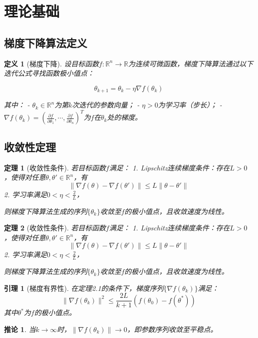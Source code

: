 \documentclass[12pt,a4paper,oneside]{article} %
\newtheorem{theorem}{定理}[section]
\newtheorem{definition}{定义}[section]
\newtheorem{lemma}{引理}[section]
\newtheorem{corollary}{推论}[section]
\begin{document}
\section{理论基础}
\subsection{梯度下降算法定义}
\begin{definition}[梯度下降]
设目标函数$f:\mathbb{R}^n \to \mathbb{R}$为连续可微函数，梯度下降算法通过以下迭代公式寻找函数极小值点：

    $$\theta_{k+1} = \theta_k - \eta \nabla f(\theta_k)$$

其中：
- $\theta_k \in \mathbb{R}^n$为第$k$次迭代的参数向量；
- $\eta > 0$为学习率（步长）；
- $\nabla f(\theta_k) = \left( \frac{\partial f}{\partial \theta_1}, \cdots, \frac{\partial f}{\partial \theta_n} \right)^T$为$f$在$\theta_k$处的梯度。
\end{definition}

\subsection{收敛性定理}
\begin{theorem}[收敛性条件]
若目标函数$f$满足：
1.  Lipschitz连续梯度条件：存在$L > 0$，使得对任意$\theta, \theta' \in \mathbb{R}^n$，有
   \[
   \|\nabla f(\theta) - \nabla f(\theta')\| \leq L \|\theta - \theta'\|
   \]
2. 学习率满足$0 < \eta < \frac{2}{L}$，

则梯度下降算法生成的序列$\{\theta_k\}$收敛至$f$的极小值点，且收敛速度为线性。
\end{theorem}
\begin{theorem}[收敛性条件]
若目标函数$f$满足：
1.  Lipschitz连续梯度条件：存在$L > 0$，使得对任意$\theta, \theta' \in \mathbb{R}^n$，有
   \[
   \|\nabla f(\theta) - \nabla f(\theta')\| \leq L \|\theta - \theta'\|
   \]
2. 学习率满足$0 < \eta < \frac{2}{L}$，

则梯度下降算法生成的序列$\{\theta_k\}$收敛至$f$的极小值点，且收敛速度为线性。
\end{theorem}
\begin{lemma}[梯度有界性]
在定理2.1的条件下，梯度序列$\{\nabla f(\theta_k)\}$满足：
\[
\|\nabla f(\theta_k)\|^2 \leq \frac{2L}{k+1} \left( f(\theta_0) - f(\theta^*) \right)
\]
其中$\theta^*$为$f$的极小值点。
\end{lemma}

\begin{corollary}
当$k \to \infty$时，$\|\nabla f(\theta_k)\| \to 0$，即参数序列收敛至平稳点。
\end{corollary}
\end{document}
